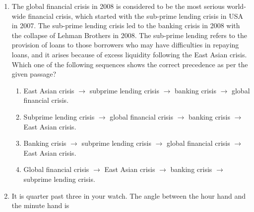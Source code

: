 \documentclass[a4paper, 11pt]{article}
\begin{document}
\begin{enumerate}
    \item The global financial crisis in 2008 is considered to be the most serious world-wide financial crisis, which started with the sub-prime lending crisis in USA in 2007. The sub-prime lending crisis led to the banking crisis in 2008 with the collapse of Lehman Brothers in 2008. The sub-prime lending refers to the provision of loans to those borrowers who may have difficulties in repaying loans, and it arises because of excess liquidity following the East Asian crisis.\\Which one of the following sequences shows the correct precedence as per the given passage?
    \begin{enumerate}
        \item East Asian crisis $\rightarrow$ subprime lending crisis $\rightarrow$ banking crisis $\rightarrow$ global financial crisis.
        \item Subprime lending crisis $\rightarrow$ global financial crisis $\rightarrow$ banking crisis $\rightarrow$ East Asian crisis.
        \item Banking crisis $\rightarrow$ subprime lending crisis $\rightarrow$ global financial crisis $\rightarrow$ East Asian crisis.
        \item Global financial crisis $\rightarrow$ East Asian crisis $\rightarrow$ banking crisis $\rightarrow$ subprime lending crisis.
    \end{enumerate}

    \hfill{}

    \item It is quarter past three in your watch. The angle between the hour hand and the minute hand is
    \begin{enumerate}
    \end{enumerate}

    \hfill{}
    

\end{enumerate}
\end{document}
